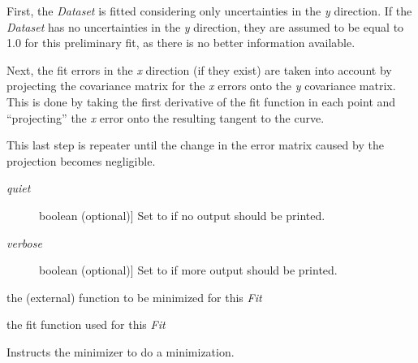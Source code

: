 \documentclass[a4paper,10pt,english]{sphinxmanual}
\begin{document}
\begin{fulllineitems}
\begin{fulllineitems}
First, the \emph{Dataset} is fitted considering only uncertainties in the
\emph{y} direction. If the \emph{Dataset} has no uncertainties in the \emph{y}
direction, they are assumed to be equal to 1.0 for this preliminary
fit, as there is no better information available.

Next, the fit errors in the \emph{x} direction (if they exist) are taken
into account by projecting the covariance matrix for the \emph{x} errors
onto the \emph{y} covariance matrix. This is done by taking the first
derivative of the fit function in each point and ``projecting'' the \emph{x}
error onto the resulting tangent to the curve.

This last step is repeater until the change in the error matrix caused
by the projection becomes negligible.
\begin{description}
\item[{\emph{quiet}}] \leavevmode{[}boolean (optional){]}
Set to  if no output should be printed.

\item[{\emph{verbose}}] \leavevmode{[}boolean (optional){]}
Set to  if more output should be printed.

\end{description}

\end{fulllineitems}


\begin{fulllineitems}
\label{index:kafe.fit.Fit.external_fcn}
the (external) function to be minimized for this \emph{Fit}

\end{fulllineitems}


\begin{fulllineitems}
\label{index:kafe.fit.Fit.fit_function}
the fit function used for this \emph{Fit}

\end{fulllineitems}


\begin{fulllineitems}
\label{index:kafe.fit.Fit.fit_one_iteration}
Instructs the minimizer to do a minimization.


\end{fulllineitems}
\end{fulllineitems}
\end{document}
